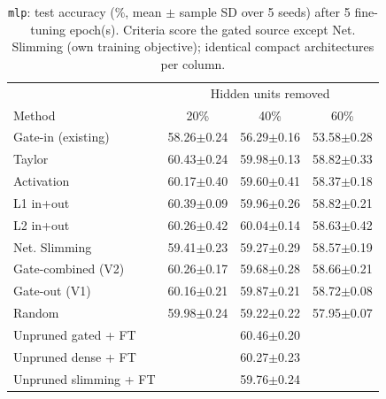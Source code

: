 \begin{table}[t]
\centering
\caption{\texttt{mlp}: test accuracy (\%, mean $\pm$ sample SD over 5 seeds) after 5 fine-tuning epoch(s). Criteria score the gated source except Net. Slimming (own training objective); identical compact architectures per column.}
\label{tab:mlp_main}
\footnotesize
\setlength{\tabcolsep}{2.5pt}
\begin{tabular}{lccc}
\toprule
 & \multicolumn{3}{c}{Hidden units removed} \\
Method & 20\% & 40\% & 60\% \\
\midrule
Gate-in (existing) & 58.26$\pm$0.24 & 56.29$\pm$0.16 & 53.58$\pm$0.28 \\
Taylor & 60.43$\pm$0.24 & 59.98$\pm$0.13 & 58.82$\pm$0.33 \\
Activation & 60.17$\pm$0.40 & 59.60$\pm$0.41 & 58.37$\pm$0.18 \\
L1 in+out & 60.39$\pm$0.09 & 59.96$\pm$0.26 & 58.82$\pm$0.21 \\
L2 in+out & 60.26$\pm$0.42 & 60.04$\pm$0.14 & 58.63$\pm$0.42 \\
Net. Slimming & 59.41$\pm$0.23 & 59.27$\pm$0.29 & 58.57$\pm$0.19 \\
Gate-combined (V2) & 60.26$\pm$0.17 & 59.68$\pm$0.28 & 58.66$\pm$0.21 \\
Gate-out (V1) & 60.16$\pm$0.21 & 59.87$\pm$0.21 & 58.72$\pm$0.08 \\
Random & 59.98$\pm$0.24 & 59.22$\pm$0.22 & 57.95$\pm$0.07 \\
\midrule
Unpruned gated + FT & \multicolumn{3}{c}{60.46$\pm$0.20} \\
Unpruned dense + FT & \multicolumn{3}{c}{60.27$\pm$0.23} \\
Unpruned slimming + FT & \multicolumn{3}{c}{59.76$\pm$0.24} \\
\bottomrule
\end{tabular}
\end{table}